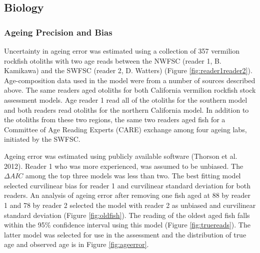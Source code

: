 \documentclass[11pt,
  english,
]{article}
\begin{document}

\hypertarget{biology}{%
\subsection{Biology}\label{biology}}

\leavevmode\tagmcend\tagstructend


\hypertarget{ageing-precision-and-bias}{%
\subsubsection{Ageing Precision and Bias}\label{ageing-precision-and-bias}}

\leavevmode\tagmcend\tagstructend

Uncertainty in ageing error was estimated using a collection of 357 vermilion rockfish otoliths with two age reads between the NWFSC (reader 1, B. Kamikawa) and the SWFSC (reader 2, D. Watters) (Figure \ref{fig:reader1reader2}). Age-composition data used in the model were from a number of sources described above. The same readers aged otoliths for both California vermilion rockfish stock assessment models. Age reader 1 read all of the otoliths for the southern model and both readers read otoliths for the northern California model. In addition to the otoliths from these two regions, the same two readers aged fish for a Committee of Age Reading Experts (CARE) exchange among four ageing labs, initiated by the SWFSC.

Ageing error was estimated using publicly available software {(Thorson et al. 2012)\leavevmode\tagmcend\tagstructend}. Reader 1 who was more experienced, was assumed to be unbiased. The {\(\Delta AIC\)\leavevmode\tagmcend\tagstructend} among the top three models was less than two. The best fitting model selected curvilinear bias for reader 1 and curvilinear standard deviation for both readers. An analysis of ageing error after removing one fish aged at 88 by reader 1 and 78 by reader 2 selected the model with reader 2 as unbiased and curvilinear standard deviation (Figure \ref{fig:oldfish}). The reading of the oldest aged fish falls within the 95\% confidence interval using this model (Figure \ref{fig:truereads}). The latter model was selected for use in the assessment and the distribution of true age and observed age is in Figure \ref{fig:ageerror}.
\end{document}
